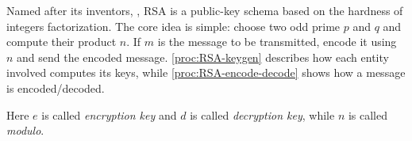 \documentclass{subfiles}
\begin{document}
    Named after its inventors, \citeauthor{RivestSA1977},
        RSA is a public-key schema based on the hardness of integers factorization.
        The core idea is simple: choose two odd prime \(p\) and \(q\) and compute their product \(n\).
        If \(m\) is the message to be transmitted, encode it using \(n\) and send the encoded message.
        \autoref{proc:RSA-keygen} describes how each entity involved computes its keys,
            while \autoref{proc:RSA-encode-decode} shows how a message is encoded/decoded.

        
    Here \(e\) is called \emph{encryption key} and \(d\) is called \emph{decryption key},
        while \(n\) is called \emph{modulo}.

        
\end{document}
